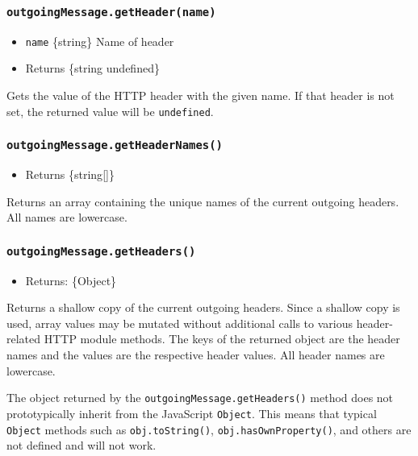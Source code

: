 \subsubsection{\texorpdfstring{\texttt{outgoingMessage.getHeader(name)}}{outgoingMessage.getHeader(name)}}\label{outgoingmessage.getheadername}

\begin{itemize}
\tightlist
\item
  \texttt{name} \{string\} Name of header
\item
  Returns \{string \textbar{} undefined\}
\end{itemize}

Gets the value of the HTTP header with the given name. If that header is
not set, the returned value will be \texttt{undefined}.

\subsubsection{\texorpdfstring{\texttt{outgoingMessage.getHeaderNames()}}{outgoingMessage.getHeaderNames()}}\label{outgoingmessage.getheadernames}

\begin{itemize}
\tightlist
\item
  Returns \{string{[}{]}\}
\end{itemize}

Returns an array containing the unique names of the current outgoing
headers. All names are lowercase.

\subsubsection{\texorpdfstring{\texttt{outgoingMessage.getHeaders()}}{outgoingMessage.getHeaders()}}\label{outgoingmessage.getheaders}

\begin{itemize}
\tightlist
\item
  Returns: \{Object\}
\end{itemize}

Returns a shallow copy of the current outgoing headers. Since a shallow
copy is used, array values may be mutated without additional calls to
various header-related HTTP module methods. The keys of the returned
object are the header names and the values are the respective header
values. All header names are lowercase.

The object returned by the \texttt{outgoingMessage.getHeaders()} method
does not prototypically inherit from the JavaScript \texttt{Object}.
This means that typical \texttt{Object} methods such as
\texttt{obj.toString()}, \texttt{obj.hasOwnProperty()}, and others are
not defined and will not work.

